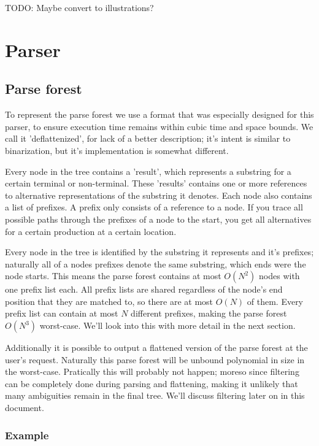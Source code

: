 \documentclass[a4paper,10pt]{article}
\begin{document}
TODO: Maybe convert to illustrations?

\section{Parser}

\subsection{Parse forest}

To represent the parse forest we use a format that was especially designed for this parser, to ensure execution time remains within cubic time and space bounds. We call it 'deflattenized', for lack of a better description; it's intent is similar to binarization, but it's implementation is somewhat different.

Every node in the tree contains a 'result', which represents a substring for a certain terminal or non-terminal. These 'results' contains one or more references to alternative representations of the substring it denotes. Each node also contains a list of prefixes. A prefix only consists of a reference to a node. If you trace all possible paths through the prefixes of a node to the start, you get all alternatives for a certain production at a certain location.

Every node in the tree is identified by the substring it represents and it's prefixes; naturally all of a nodes prefixes denote the same substring, which ends were the node starts. This means the parse forest contains at most $O(N^{2})$ nodes with one prefix list each. All prefix lists are shared regardless of the node's end position that they are matched to, so there are at most $O(N)$ of them. Every prefix list can contain at most $N$ different prefixes, making the parse forest $O(N^{3})$ worst-case. We'll look into this with more detail in the next section.

Additionally it is possible to output a flattened version of the parse forest at the user's request. Naturally this parse forest will be unbound polynomial in size in the worst-case. Pratically this will probably not happen; moreso since filtering can be completely done during parsing and flattening, making it unlikely that many ambiguities remain in the final tree. We'll discuss filtering later on in this document.

\subsubsection{Example}
\end{document}
